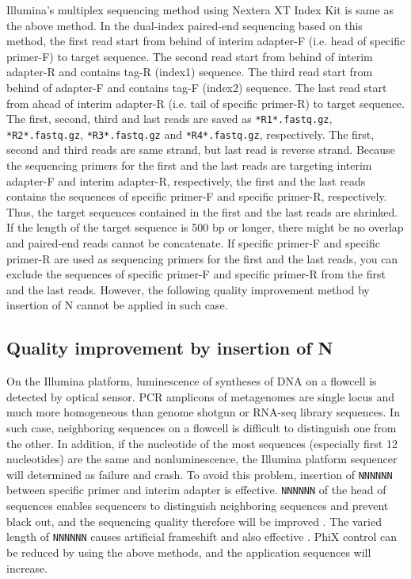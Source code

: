 \documentclass[titlepage,10pt,a4paper,english]{jsbook}
\begin{document}
Illumina's multiplex sequencing method \citep{Illumina2013} using Nextera XT Index Kit is same as the above method.
In the dual-index paired-end sequencing based on this method, the first read start from behind of interim adapter-F (i.e. head of specific primer-F) to target sequence.
The second read start from behind of interim adapter-R and contains tag-R (index1) sequence.
The third read start from behind of adapter-F and contains tag-F (index2) sequence.
The last read start from ahead of interim adapter-R (i.e. tail of specific primer-R) to target sequence.
The first, second, third and last reads are saved as \texttt{*{\textunderscore}R1{\textunderscore}*.fastq.gz}, \texttt{*{\textunderscore}R2{\textunderscore}*.fastq.gz}, \texttt{*{\textunderscore}R3{\textunderscore}*.fastq.gz} and \texttt{*{\textunderscore}R4{\textunderscore}*.fastq.gz}, respectively.
The first, second and third reads are same strand, but last read is reverse strand.
Because the sequencing primers for the first and the last reads are targeting interim adapter-F and interim adapter-R, respectively, the first and the last reads contains the sequences of specific primer-F and specific primer-R, respectively.
Thus, the target sequences contained in the first and the last reads are shrinked.
If the length of the target sequence is 500 bp or longer, there might be no overlap and paired-end reads cannot be concatenate.
If specific primer-F and specific primer-R are used as sequencing primers for the first and the last reads, you can exclude the sequences of specific primer-F and specific primer-R from the first and the last reads.
However, the following quality improvement method by insertion of N cannot be applied in such case.

\subsection{Quality improvement by insertion of N}

On the Illumina platform, luminescence of syntheses of DNA on a flowcell is detected by optical sensor.
PCR amplicons of metagenomes are single locus and much more homogeneous than genome shotgun or RNA-seq library sequences.
In such case, neighboring sequences on a flowcell is difficult to distinguish one from the other.
In addition, if the nucleotide of the most sequences (especially first 12 nucleotides) are the same and nonluminescence, the Illumina platform sequencer will determined as failure and crash.
To avoid this problem, insertion of \texttt{NNNNNN} between specific primer and interim adapter is effective.
\texttt{NNNNNN} of the head of sequences enables sequencers to distinguish neighboring sequences and prevent black out, and the sequencing quality therefore will be improved \citep{Nelson2014}.
The varied length of \texttt{NNNNNN} causes artificial frameshift and also effective \citep{Fadrosh2014}.
PhiX control can be reduced by using the above methods, and the application sequences will increase.
\end{document}
